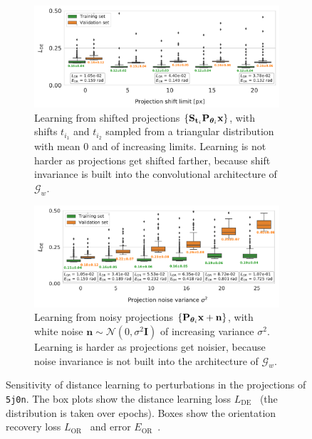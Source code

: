\begin{figure}[ht!]
    \centering
    \begin{subfigure}[t]{0.47\linewidth}
        \includegraphics[width=\linewidth]{figures/de_translation_nums}
        \caption{%
            Learning from shifted projections $\{ \mathbf{S}_{\mathbf{t}_i} \mathbf{P}_{{\boldsymbol{\theta}}_i} \mathbf{x} \}$, with shifts $t_{i_1}$ and $t_{i_2}$ sampled from a triangular distribution with mean 0 and of increasing limits.
            Learning is not harder as projections get shifted farther, because shift invariance is built into the convolutional architecture of $\mathcal{G}_w$.
    }\label{fig:results:distance-estimation:shift}
    \end{subfigure}
    \hfill
    \begin{subfigure}[t]{0.47\linewidth}
        \includegraphics[width=\linewidth]{figures/de_noises_nums}
        \caption{%
            Learning from noisy projections $\{ \mathbf{P}_{{\boldsymbol{\theta}}_i} \mathbf{x} + \mathbf{n} \}$, with white noise $\mathbf{n} \sim \mathcal{N}(0, \sigma^2\mathbf{I})$ of increasing variance $\sigma^2$.
            Learning is harder as projections get noisier, because noise invariance is not built into the architecture of $\mathcal{G}_w$.
        }\label{fig:results:distance-estimation:noise}
    \end{subfigure}
    \caption{%
        Sensitivity of distance learning to perturbations in the projections of \texttt{5j0n}.
        The box plots show the distance learning loss $L_\text{DE}$~ (the distribution is taken over epochs).
        Boxes show the orientation recovery loss $L_\text{OR}$~ and error $E_\text{OR}$~.
    }\label{fig:results:distance-estimation}
\end{figure}

